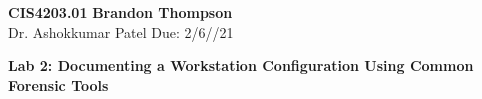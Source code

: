\noindent
\textbf{CIS4203.01} \hfill \textbf{Brandon Thompson} \\
\normalsize Dr. Ashokkumar Patel \hfill Due: 2/6//21\\

\begin{center}
\textbf{Lab 2: Documenting a Workstation Configuration Using Common Forensic Tools}
\end{center}